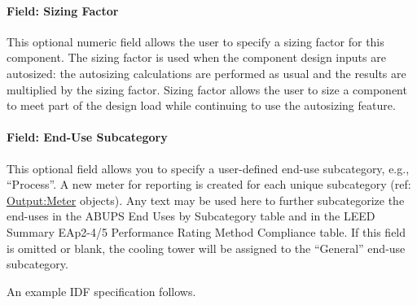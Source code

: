 \paragraph{Field: Sizing Factor}\label{field-sizing-factor-1}

This optional numeric field allows the user to specify a sizing factor for this component. The sizing factor is used when the component design inputs are autosized: the autosizing calculations are performed as usual and the results are multiplied by the sizing factor. Sizing factor allows the user to size a component to meet part of the design load while continuing to use the autosizing feature.

\paragraph{Field: End-Use Subcategory}\label{end-use-subcategory-03}

This optional field allows you to specify a user-defined end-use subcategory, e.g., ``Process''. A new meter for reporting is created for each unique subcategory (ref: \hyperref[outputmeter-and-outputmetermeterfileonly]{Output:Meter} objects). Any text may be used here to further subcategorize the end-uses in the ABUPS End Uses by Subcategory table and in the LEED Summary EAp2-4/5 Performance Rating Method Compliance table. If this field is omitted or blank, the cooling tower will be assigned to the ``General'' end-use subcategory.

An example IDF specification follows.

